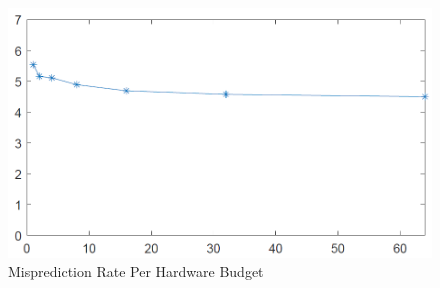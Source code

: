 \documentclass[conference]{IEEEtran}
\begin{document}
\begin{figure}[htbp]
\begin{center}
\includegraphics[width=\linewidth]{results.png} 
\end{center}	   
\caption{Misprediction Rate Per Hardware Budget}\label{results}
\end{figure}



%
%

\end{document}
